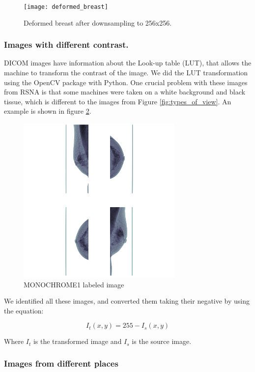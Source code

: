 \documentclass[conference]{IEEEtran}
\begin{document}
\begin{figure}[ht]
\centering
\texttt{[image: deformed\_breast]}
\caption{Deformed breast after downsampling to 256x256.}
\label{fig:deformed}

\end{figure}

\subsubsection{Images with different contrast.}

DICOM images have information about the Look-up table (LUT), that allows the machine to transform the contrast of the image. We did the LUT transformation using the OpenCV package with Python. One crucial problem with these images from RSNA is that some machines were taken on a white background and black tissue, which is different to the images from Figure \ref{fig:types_of_view}. An example is shown in figure \ref{fig:monochrome}.

\begin{figure}[ht]
\centering
\includegraphics[width=3.2in]{monochrome_example}
\caption{MONOCHROME1 labeled image}
\label{fig:monochrome}
\end{figure}

We identified all these images, and converted them taking their negative by using the equation:

\begin{equation}
I_t(x,y) = 255 - I_s(x,y)
\end{equation}

Where $I_t$ is the transformed image and $I_s$ is the source image. 

\subsubsection{Images from different places}
\end{document}
